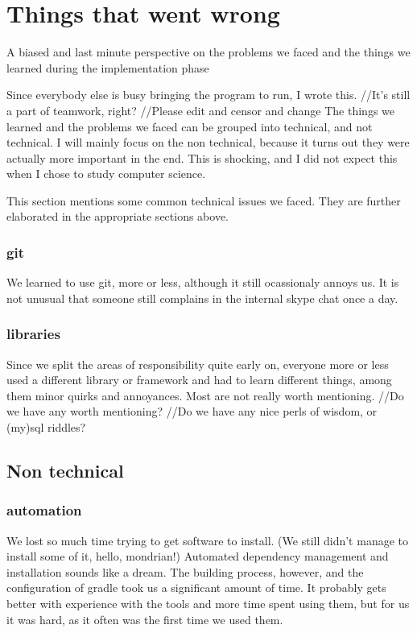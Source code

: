 \section{Things that went wrong}
A biased and last minute perspective on the problems we faced and the things we learned during the implementation phase

Since everybody else is busy bringing the program to run, I wrote this. //It's still a part of teamwork, right?
//Please edit and censor and change
The things we learned and the problems we faced can be grouped into technical,
and not technical. I will mainly focus on the non technical, because it turns out
they were actually more important in the end.
This is shocking, and I did not expect this when I chose to study computer science.
  
    This section mentions some common technical issues we faced. They are further elaborated in the
    appropriate sections above.
\subsubsection{git}
    We learned to use git, more or less, although it still ocassionaly annoys us.
    It is not unusual that someone still complains in the internal skype chat once a day.
\subsubsection{libraries}
    Since we split the areas of responsibility quite early on, everyone more or less used
    a different library or framework and had to learn different things, among them minor quirks and annoyances.
    Most are not really worth mentioning. //Do we have any worth mentioning?
    //Do we have any nice perls of wisdom, or (my)sql riddles? 
    
\subsection{Non technical}

\subsubsection{automation}
    We lost so much time trying to get software to install. (We still 
    didn't manage to install some of it, hello, mondrian!)
    Automated dependency management and installation sounds like a dream. 
    The building process, however, and the configuration of gradle took us a significant amount of time.
    It probably gets better with experience with the tools and more time spent using them,
    but for us it was hard, as it often was the first time we used them.
    
